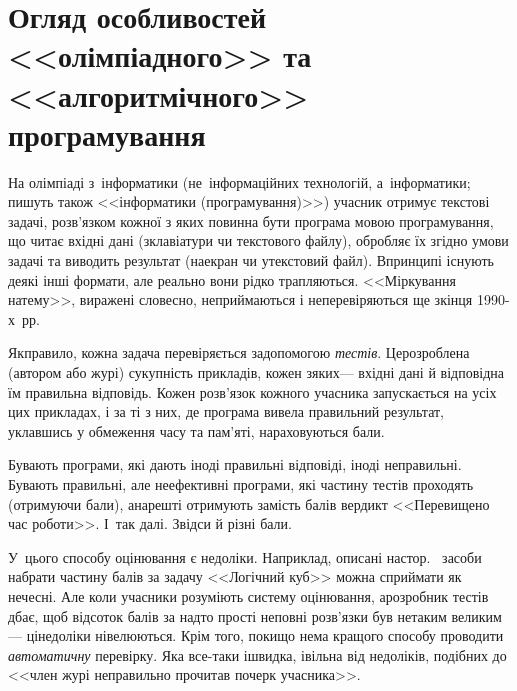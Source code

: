 \documentclass[14pt,a4paper]{extarticle}
\begin{document}
\section{Огляд особливостей <<олімпіадного>> та <<алгоритмічного>> програмування}
\label{sec:FAQ}

На олімпіаді з~інформатики (не~інформаційних технологій, а~інформатики; пишуть також <<інформатики (програмування)>>) учасник отримує текстові задачі, розв'язком кожної з яких повинна бути програма мовою програмування, що читає вхідні дані (з\nolinebreak[3] клавіатури чи текстового файлу), обробляє їх згідно умови задачі та виводить результат (на\nolinebreak[3] екран чи у\nolinebreak[3] текстовий файл). В\nolinebreak[3] принципі існують деякі інші формати, але реально вони рідко трапляються. <<Міркування на\nolinebreak[3] тему>>, виражені словесно, не\nolinebreak[3] приймаються і не\nolinebreak[3] перевіряються ще з\nolinebreak[3] кінця \mbox{1990-х}~рр.

Як\nolinebreak[3] правило, кожна задача перевіряється за\nolinebreak[3] допомогою \emph{тестів}. Це\nolinebreak[2] розроблена (автором або журі) сукупність прикладів, кожен з\nolinebreak[1] яких\nolinebreak[3] --- вхідні дані й відповідна їм правильна відповідь. Кожен розв'язок кожного учасника запускається на усіх цих прикладах, і за ті з них, де програма вивела правильний результат, уклавшись у обмеження часу та пам'яті, нараховуються бали. 

Бувають програми, які дають іноді правильні відповіді, іноді неправильні. Бувають правильні, але неефективні програми, які частину тестів проходять (отримуючи бали), а\nolinebreak[2] на\nolinebreak[2] решті отримують замість балів вердикт <<Перевищено час роботи>>. І~так далі. Звідси й різні бали. 

У~цього способу оцінювання є недоліки. Наприклад, описані на\nolinebreak[2] стор.~\pageref{text:log-cube-how-to-get-part-of-points-easily} засоби набрати частину балів за задачу <<Логічний куб>> можна сприймати як нечесні. Але коли учасники розуміють систему оцінювання, а\nolinebreak[3] розробник тестів дбає, щоб відсоток балів за надто прості неповні розв'язки був не\nolinebreak[3] таким великим\nolinebreak[3] --- ці\nolinebreak[3] недоліки нівелюються. Крім того, поки\nolinebreak[3] що нема кращого способу проводити \emph{автоматичну} перевірку. Яка все-таки і\nolinebreak[3] швидка, і\nolinebreak[3] вільна від недоліків, подібних до <<член журі неправильно прочитав почерк учасника>>.
\end{document}
